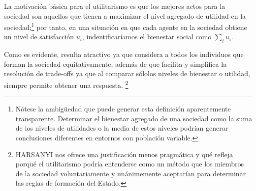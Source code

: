 \documentclass[10pt,a4paper]{article}
\begin{document}
La motivación básica para el utilitarismo es que los mejores actos para la sociedad son aquellos que tienen a maximizar el nivel agregado de utilidad en la sociedad;\footnote{%
    Nótese la ambigüedad que puede generar esta definición aparentemente transparente. Determinar el bienestar agregado de una sociedad como la suma de los niveles de utilidades o la media de estos niveles podrían generar conclusiones diferentes en entornos con población variable.
} por tanto, en una situación en que cada agente en la sociedad obtiene un nivel de satisfacción $u_i$, indentificaríamos el bienestar social como $\sum_iu_i$.

Como es evidente, resulta atractivo ya que considera a todos los individuos que forman la sociedad equitativamente, además de que facilita y simplifica la resolución de trade-offs ya que al comparar sólolos niveles de bienestar o utilidad, siempre permite obtener una respuesta. \footnote{%
    HARSANYI nos ofrece una justificación menos pragmática y qué refleja porqué el utilitarismo podría entenderse como un método que los miembros de la sociedad voluntariamente y unánimemente aceptarían para determinar las reglas de formación del Estado.

}
\end{document}
